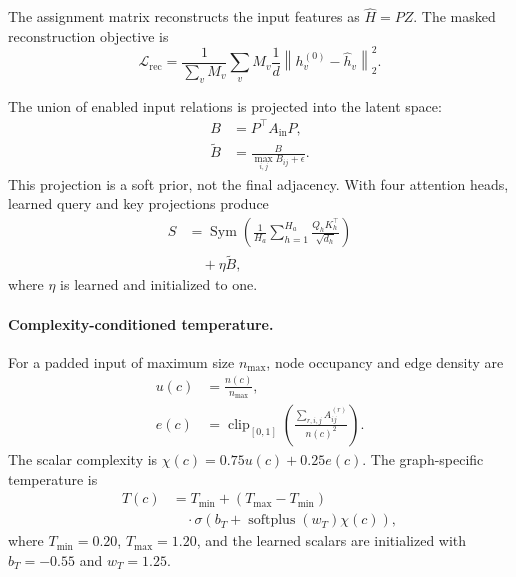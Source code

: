 \documentclass[authoryear,final,5p,times,twocolumn]{elsarticle}
\theoremstyle{plain}
\begin{document}
The assignment matrix reconstructs the input features as $\widehat{H}=PZ$. The
masked reconstruction objective is
\begin{equation}
\mathcal{L}_{\mathrm{rec}}=
\frac{1}{\sum_v M_v}
\sum_v M_v\frac{1}{d}\left\|h_v^{(0)}-\widehat{h}_v\right\|_2^2.
\label{eq:reconstruction_loss}
\end{equation}

The union of enabled input relations is projected into the latent space:
\begin{equation}
\begin{aligned}
B&=P^{\top}A_{\mathrm{in}}P,\\
\widetilde{B}&=\frac{B}{\max_{i,j}B_{ij}+\epsilon}.
\end{aligned}
\label{eq:structural_prior}
\end{equation}
This projection is a soft prior, not the final adjacency. With four attention
heads, learned query and key projections produce
\begin{equation}
\begin{aligned}
S
&=\operatorname{Sym}\!\left(
\frac{1}{H_a}\sum_{h=1}^{H_a}
\frac{Q_hK_h^{\top}}{\sqrt{d_h}}
\right)\\
&\quad+\eta\widetilde{B},
\end{aligned}
\label{eq:latent_affinity}
\end{equation}
where $\eta$ is learned and initialized to one.

\paragraph{Complexity-conditioned temperature.}
\begingroup
\color{green!50!black}
For a padded input of maximum size $n_{\max}$, node occupancy and edge density are
\begin{equation}
\begin{aligned}
u(c)&=\frac{n(c)}{n_{\max}},\\
e(c)&=\operatorname{clip}_{[0,1]}\!\left(
\frac{\sum_{r,i,j}A_{ij}^{(r)}}{n(c)^2}
\right).
\end{aligned}
\end{equation}
The scalar complexity is $\chi(c)=0.75u(c)+0.25e(c)$. The graph-specific
temperature is
\begin{equation}
\begin{aligned}
T(c)
&=T_{\min}+(T_{\max}-T_{\min})\\
&\quad\cdot\sigma\!\left(
b_T+\operatorname{softplus}(w_T)\chi(c)
\right),
\end{aligned}
\label{eq:adaptive_temperature}
\end{equation}
where $T_{\min}=0.20$, $T_{\max}=1.20$, and the learned scalars are initialized
with $b_T=-0.55$ and $w_T=1.25$.
\endgroup
\end{document}
